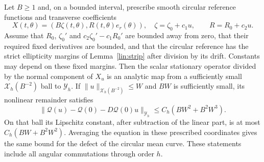 \begin{lemma}\label{gauge:mixed}
Let $B\ge1$ and, on a bounded interval, prescribe smooth circular reference
functions and transverse coefficients
\begin{equation}
 X(t,\theta)=(B\zeta(t,\theta),R(t,\theta)e_r(\theta)),\quad
 \zeta=\zeta_0+c_1u,\qquad R=R_0+c_2u.
 \label{gauge:immersion}
\end{equation}
Assume that $R_0$, $\zeta_0'$ and
$c_2\zeta_0'-c_1R_0'$ are bounded away from zero, that their required
fixed derivatives are bounded, and that the circular reference has the
strict ellipticity margins of Lemma~\ref{lin:strip} after division by its
drift.  Constants may depend on these fixed margins.
Then the scalar stationary operator divided by the normal component of
$X_u$ is an analytic map from a sufficiently small
$\mathcal X_h(B^{-2})$ ball to $\mathcal Y_h$.
If $\|u\|_{\mathcal X_h(B^{-2})}\le W$ and $BW$ is sufficiently small,
its nonlinear remainder satisfies
\begin{equation}
 \|\mathcal Q(u)-\mathcal Q(0)-D\mathcal Q(0)u\|_{\mathcal Y_h}
       \le C_h(BW^2+B^2W^3).
 \label{gauge:mixed-bound}
\end{equation}
On that ball its Lipschitz constant, after subtraction of the linear part,
is at most $C_h(BW+B^2W^2)$.  Averaging the equation in these prescribed
coordinates gives the same bound for the defect of the circular mean curve.
These statements include all angular commutations through order $h$.
\end{lemma}


